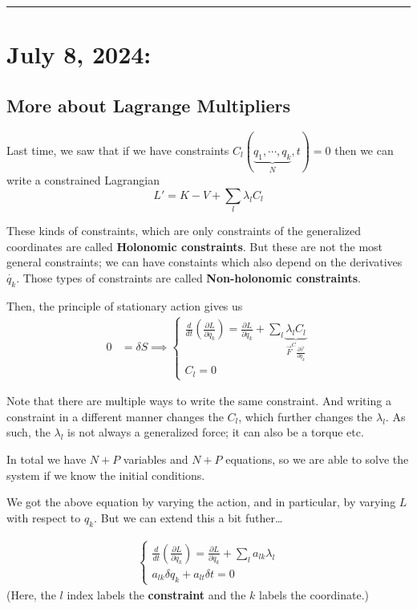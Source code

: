 \documentclass[11pt]{article}
\begin{document}
\hrule

\pagebreak
\section{July 8, 2024:}

\vskip 0.5cm
\subsection{More about Lagrange Multipliers}
Last time, we saw that if we have constraints $C_l \left(\underbrace{q_1, \cdots, q_k}_{N}, t\right) = 0$ then we can write a constrained Lagrangian
\[ L' = K - V + \sum_{l} \lambda_l C_l \]

These kinds of constraints, which are only constraints of the generalized coordinates are called \textbf{Holonomic constraints}. But these are not the most general constraints; we can have constaints which also depend on the derivatives $\dot{q_{k}}$. Those types of constraints are called \textbf{Non-holonomic constraints}.

Then, the principle of stationary action gives us 
\begin{align*}
  0 &= \delta S \implies \begin{cases}
    \frac{d}{dt} \left( \frac{\partial L}{\partial \dot{q_{k}}} \right) = \frac{\partial L}{\partial q_{k}} + \sum_{l} \underbrace{\lambda_l C_l}_{\vec{F}^C \frac{\partial \vec{r}}{\partial q_{k}} } \\
    C_l = 0
  \end{cases}
\end{align*}

\vskip 0.5cm
Note that there are multiple ways to write the same constraint. And writing a constraint in a different manner changes the $C_l$, which further changes the $\lambda_l$. As such, the $\lambda_l$ is not always a generalized force; it can also be a torque etc.

\vskip 0.5cm
In total we have $N+P$ variables and $N+P$ equations, so we are able to solve the system if we know the initial conditions.

\vskip 0.5cm
We got the above equation by varying the action, and in particular, by varying $L$ with respect to $q_k$. But we can extend this a bit futher\dots

\begin{align*}
  \begin{cases}
    \frac{d}{dt} \left( \frac{\partial L}{\partial \dot{q_{k}}}  \right)= \frac{\partial L}{\partial q_{k}} + \sum_{l} a_{lk} \lambda_{l} \\
    a_{lk} \delta q_{k} + a_{lt} \delta t = 0
  \end{cases}
\end{align*}
(Here, the $l$ index labels the \textbf{constraint} and the $k$ labels the coordinate.)
\end{document}
